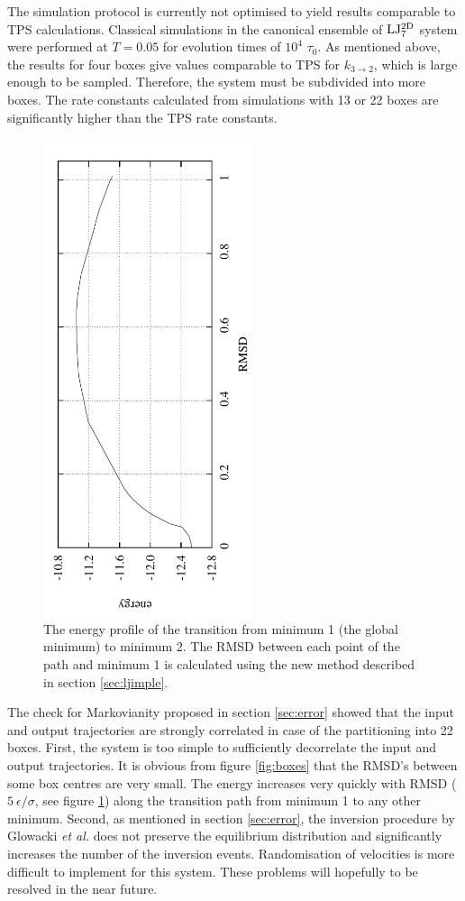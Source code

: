 The simulation protocol is currently not optimised to yield results comparable to TPS calculations.\cite{Dellago1998b}
Classical simulations in the canonical ensemble of ${\rm LJ_7^{2D}}$ system were performed at $T=0.05$ for evolution times of $10^4$ $\tau_0$.
As mentioned above, the results for four boxes give values comparable to TPS for $k_{3 \rightarrow 2}$, which is large enough to be sampled.
Therefore, the system must be subdivided into more boxes.
The rate constants calculated from simulations with 13 or 22 boxes are significantly higher than the TPS rate constants.


\begin{figure}[h]
\centering
\includegraphics[height=14cm, angle=270]{Images/profileLJ.pdf}
\caption[Energy profile of the configuration transition of ${\rm LJ_7^{2D}}$.]{The energy profile of the transition from minimum 1 (the global minimum) to minimum 2. The RMSD between each point of the path and minimum 1 is calculated using the new method described in section \ref{sec:ljimple}.}
\label{fig:profile}
\end{figure}

The check for Markovianity proposed in section \ref{sec:error} showed that the input and output trajectories are strongly correlated in case of the partitioning into 22 boxes.
First, the system is too simple to sufficiently decorrelate the input and output trajectories.
It is obvious from figure \ref{fig:boxes} that the RMSD's between some box centres are very small.
The energy increases very quickly with RMSD ($5 ~ \epsilon / \sigma$, see figure \ref{fig:profile}) along the transition path from minimum 1 to any other minimum.
Second, as mentioned in section \ref{sec:error}, the inversion procedure by Glowacki {\it et al.}\cite{Glowacki2009} does not preserve the equilibrium distribution and significantly increases the number of the inversion events.
Randomisation of velocities is more difficult to implement for this system.
These problems will hopefully to be resolved in the near future.

